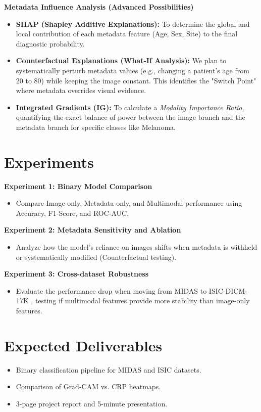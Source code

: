 \documentclass[12pt]{extarticle}
\begin{document}
\textbf{Metadata Influence Analysis (Advanced Possibilities)}
\begin{itemize}
\item \textbf{SHAP (Shapley Additive Explanations):} To determine the global and local contribution of each metadata feature (Age, Sex, Site) to the final diagnostic probability.
\item \textbf{Counterfactual Explanations (What-If Analysis):} We plan to systematically perturb metadata values (e.g., changing a patient's age from 20 to 80) while keeping the image constant. This identifies the "Switch Point" where metadata overrides visual evidence.
\item \textbf{Integrated Gradients (IG):} To calculate a \textit{Modality Importance Ratio}, quantifying the exact balance of power between the image branch and the metadata branch for specific classes like Melanoma.
\end{itemize}


\section*{Experiments}

\textbf{Experiment 1: Binary Model Comparison}
\begin{itemize}
\item Compare Image-only, Metadata-only, and Multimodal performance using Accuracy, F1-Score, and ROC-AUC.
\end{itemize}

\textbf{Experiment 2: Metadata Sensitivity and Ablation}
\begin{itemize}
\item Analyze how the model's reliance on images shifts when metadata is withheld or systematically modified (Counterfactual testing).
\end{itemize}

\textbf{Experiment 3: Cross-dataset Robustness}
\begin{itemize}
\item Evaluate the performance drop when moving from MIDAS to ISIC-DICM-17K \cite{isicdicm17k2023}, testing if multimodal features provide more stability than image-only features.
\end{itemize}


\section*{Expected Deliverables}
\begin{itemize}
\item Binary classification pipeline for MIDAS and ISIC datasets.
\item Comparison of Grad-CAM vs. CRP heatmaps.
\item 3-page project report and 5-minute presentation.
\end{itemize}



\end{document}
